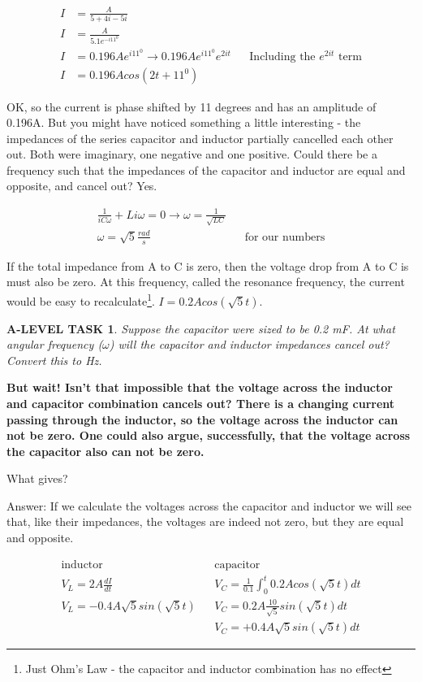 \documentclass{book}
\numberwithin{equation}{section}
\newtheorem{alevel}{A-LEVEL TASK}
\theoremstyle{definition}
\begin{document}
\begin{align*}
I &= \frac{A}{5+4i-5i}\\
I &= \frac{A}{5.1e^{-i11^0}}\\
I &= 0.196Ae^{i11^0} \rightarrow 0.196Ae^{i11^0}e^{2it} && \text{Including the $e^{2it}$ term}\\
I &= 0.196Acos(2t+11^0)
\end{align*}

OK, so the current is phase shifted by 11 degrees and has an amplitude of 0.196A. But you might have noticed something a little interesting - the impedances of the series capacitor and inductor partially cancelled each other out. Both were imaginary, one negative and one positive. Could there be a frequency such that the impedances of the capacitor and inductor are equal and opposite, and cancel out? Yes.

\begin{align*}
\frac{1}{iC\omega}+Li\omega=0 \rightarrow \omega=\frac{1}{\sqrt{LC}}\\
\omega = \sqrt{5} \frac{rad}{s}&&\text{for our numbers}
\end{align*}

If the total impedance from A to C is zero, then the voltage drop from A to C is must also be zero. At this frequency, called the resonance frequency, the current would be easy to recalculate\footnote{Just Ohm's Law - the capacitor and inductor combination has no effect}. $I = 0.2Acos(\sqrt{5}t)$.

\begin{alevel}
Suppose the capacitor were sized to be 0.2 mF. At what angular frequency ($\omega$) will the capacitor and inductor impedances cancel out? Convert this to Hz.
\end{alevel}

\textbf{But wait! Isn't that impossible that the voltage across the inductor and capacitor combination cancels out? There is a changing current passing through the inductor, so the voltage across the inductor can not be zero. One could also argue, successfully, that the voltage across the capacitor also can not be zero.}\par

What gives?\par

Answer: If we calculate the voltages across the capacitor and inductor we will see that, like their impedances, the voltages are indeed not zero, but they are equal and opposite.

\begin{align*}
\text{inductor}			&&\text{capacitor}\\
V_L=2A\frac{dI}{dt}		&&V_C=\frac{1}{0.1}\int_0^t {0.2Acos(\sqrt{5}t)dt}\\
V_L=-0.4A\sqrt{5}sin(\sqrt{5}t)	&&V_C=0.2A\frac{10}{\sqrt{5}}sin(\sqrt{5}t)dt\\
				&&V_C=+0.4A\sqrt{5}sin(\sqrt{5}t)dt
\end{align*}
\end{document}
